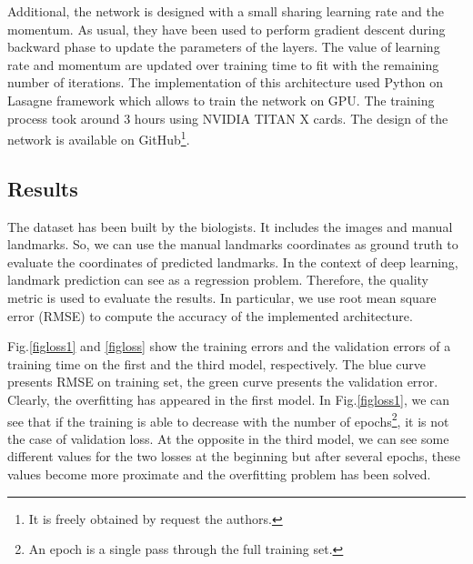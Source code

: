 \documentclass[conference]{IEEEtran}
\begin{document}
Additional, the network is designed with a small sharing learning rate and the momentum. As usual, they have been used to perform gradient descent during backward phase to update the parameters of the layers. The value of learning rate and momentum are updated over training time to fit with the remaining number of iterations. The implementation of this architecture used Python on Lasagne framework\cite{lasagne} which allows to train the network on GPU. The training process took around 3 hours using NVIDIA TITAN X cards. The design of the network is available on GitHub\footnote{It is freely obtained by request the authors.}.
\subsection{Results}
The dataset has been built by the biologists. It includes the images and manual landmarks. So, we can use the manual landmarks coordinates as ground truth to evaluate the coordinates of predicted landmarks. In the context of deep learning, landmark prediction can see as a regression problem. Therefore, the quality metric is used to evaluate the results. In particular, we use root mean square error (RMSE) to compute the accuracy of the implemented architecture. %

Fig.\ref{figloss1} and \ref{figloss} show the training errors and the validation errors of a training time on the first and the third model, respectively. The blue curve presents RMSE on training set, the green curve presents the validation error. Clearly, the overfitting has appeared in the first model. In Fig.\ref{figloss1}, we can see that if the training is able to decrease with the number of epochs\footnote{An epoch is a single pass through the full training set.}, it is not the case of validation loss. At the opposite in the third model, we can see some different values for the two losses at the beginning but after several epochs, these values become more proximate and the overfitting problem has been solved.

\end{document}
